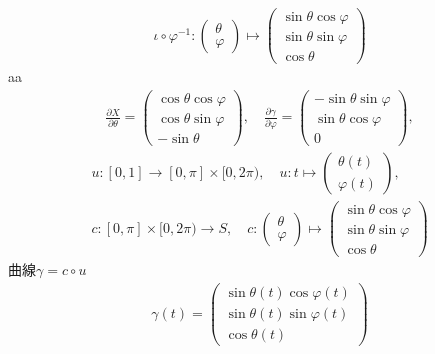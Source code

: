 \documentclass[../main.tex]{subfiles}
\begin{document}
\begin{align*}
    \iota \circ \varphi^{-1}\colon
    \begin{pmatrix}
        \theta \\
        \varphi
    \end{pmatrix}
    \mapsto
    \begin{pmatrix}
        \sin \theta \cos \varphi \\
        \sin \theta \sin \varphi \\
        \cos \theta
    \end{pmatrix}
\end{align*}
aa
\begin{align*}
    \frac{\partial X}{\partial \theta}
    =
    \begin{pmatrix}
        \cos \theta \cos \varphi \\
        \cos \theta \sin \varphi \\
        - \sin \theta
    \end{pmatrix},
    \quad
    \frac{\partial \gamma}{\partial \varphi}
    =
    \begin{pmatrix}
        - \sin \theta \sin \varphi \\
        \sin \theta \cos \varphi \\
        0
    \end{pmatrix},
\end{align*}
\begin{gather*}
    u \colon [0, 1] \to [0, \pi] \times [0, 2 \pi) , \quad
    u \colon t \mapsto
    \begin{pmatrix}
        \theta(t) \\
        \varphi(t)
    \end{pmatrix}, \\
    c \colon
    [0, \pi] \times [0, 2 \pi) \to S, \quad
    c \colon
    \begin{pmatrix}
        \theta \\
        \varphi
    \end{pmatrix}
    \mapsto
    \begin{pmatrix}
        \sin \theta \cos \varphi \\
        \sin \theta \sin \varphi \\
        \cos \theta
    \end{pmatrix}
\end{gather*}
曲線\(\gamma = c \circ u\)
\begin{align*}
    \gamma(t) =
    \begin{pmatrix}
        \sin \theta(t) \cos \varphi(t) \\
        \sin \theta(t) \sin \varphi(t) \\
        \cos \theta(t)
    \end{pmatrix}
\end{align*}
\end{document}
